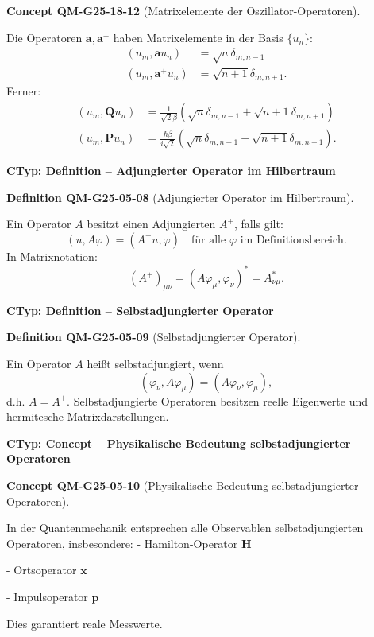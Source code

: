 \documentclass[10pt, letterpaper]{article}
\newcommand{\CustomHeading}[3]{%
  \par\medskip\noindent%
  \textbf{#1 #2} \textnormal{(#3)}.\enskip%
}
\newenvironment{DEF}[2]{\begin{unitbox}\CustomHeading{Definition}{#1}{#2}}{\end{unitbox}}
\newenvironment{CONC}[2]{\begin{unitbox}\CustomHeading{Concept}{#1}{#2}}{\end{unitbox}}
\begin{document}
\begin{CONC}{QM-G25-18-12}{Matrixelemente der Oszillator-Operatoren}
Die Operatoren $\mathbf{a}, \mathbf{a}^+$ haben Matrixelemente in der Basis $\{u_n\}$:
\[
\begin{aligned}
(u_m, \mathbf{a} u_n) &= \sqrt{n} \delta_{m,n-1} \\
(u_m, \mathbf{a}^+ u_n) &= \sqrt{n+1} \delta_{m,n+1}.
\end{aligned}
\]
Ferner:
\[
\begin{aligned}
(u_m, \mathbf{Q} u_n) &= \frac{1}{\sqrt{2}\beta} \left( \sqrt{n} \delta_{m,n-1} + \sqrt{n+1} \delta_{m,n+1} \right) \\
(u_m, \mathbf{P} u_n) &= \frac{\hbar\beta}{i\sqrt{2}} \left( \sqrt{n} \delta_{m,n-1} - \sqrt{n+1} \delta_{m,n+1} \right).
\end{aligned}
\]
\end{CONC}



\textbf{CTyp: Definition – Adjungierter Operator im Hilbertraum}

\begin{DEF}{QM-G25-05-08}{Adjungierter Operator im Hilbertraum}
Ein Operator $A$ besitzt einen Adjungierten $A^+$, falls gilt:
\[
(u, A \varphi) = (A^+ u, \varphi) \quad \text{für alle } \varphi \text{ im Definitionsbereich}.
\]
In Matrixnotation:
\[
(A^+)_{\mu\nu} = (A \varphi_\mu, \varphi_\nu)^* = A^*_{\nu\mu}.
\]
\end{DEF}


\textbf{CTyp: Definition – Selbstadjungierter Operator}

\begin{DEF}{QM-G25-05-09}{Selbstadjungierter Operator}
Ein Operator $A$ heißt selbstadjungiert, wenn
\[
(\varphi_\nu, A \varphi_\mu) = (A \varphi_\nu, \varphi_\mu),
\]
d.h. $A = A^+$. Selbstadjungierte Operatoren besitzen reelle Eigenwerte und hermitesche Matrixdarstellungen.
\end{DEF}


\textbf{CTyp: Concept – Physikalische Bedeutung selbstadjungierter Operatoren}

\begin{CONC}{QM-G25-05-10}{Physikalische Bedeutung selbstadjungierter Operatoren}
In der Quantenmechanik entsprechen alle Observablen selbstadjungierten Operatoren, insbesondere:
- Hamilton-Operator $\mathbf{H}$

- Ortsoperator $\mathbf{x}$

- Impulsoperator $\mathbf{p}$

Dies garantiert reale Messwerte.
\end{CONC}
\end{document}
